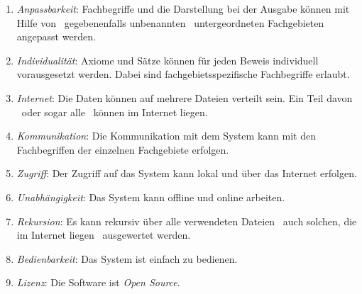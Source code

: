 \documentclass[english,ngerman,parskip=half,headsepline,footsepline]{scrreprt}
\begin{document}
\begin{enumerate}
		\item \label{Ziel:Anpassbarkeit} \emph{Anpassbarkeit}: Fachbegriffe und die Darstellung bei der Ausgabe können mit Hilfe von \textendash\ gegebenenfalls unbenannten \textendash\ untergeordneten Fachgebieten angepasst werden.

		\item \label{Ziel:Individualität} \emph{Individualität}: Axiome und Sätze können für jeden Beweis individuell vorausgesetzt werden. Dabei sind fachgebietsspezifische Fachbegriffe erlaubt.

		\item \label{Ziel:Internet} \emph{Internet}: Die Daten können auf mehrere Dateien verteilt sein. Ein Teil davon \textendash\ oder sogar alle \textendash\ können im Internet liegen.

		\item \label{Ziel:Kommunikation} \emph{Kommunikation}: Die Kommunikation mit dem System kann mit den Fachbegriffen der einzelnen Fachgebiete erfolgen.

		\item \label{Ziel:Zugriff} \emph{Zugriff}: Der Zugriff auf das System kann lokal und über das Internet erfolgen.

		\item \label{Ziel:Unabhängigkeit} \emph{Unabhängigkeit}: Das System kann offline und online arbeiten.

		\item \label{Ziel:Rekursion} \emph{Rekursion}: Es kann rekursiv über alle verwendeten Dateien \textendash\ auch solchen, die im Internet liegen \textendash\ ausgewertet werden.

		\item \label{Ziel:Bedienbarkeit} \emph{Bedienbarkeit}: Das System ist einfach zu bedienen.

		\item \label{Ziel:Lizenz} \emph{Lizenz}: Die Software ist \emph{Open Source}.

	\end{enumerate}
\end{document}
